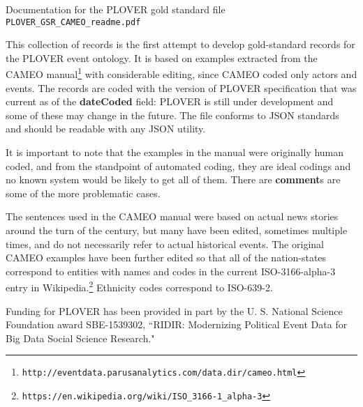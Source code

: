 \documentclass[11pt, oneside]{article}   	%
\newcommand{\field}[1]{\textsf{\textbf{#1}}}
\begin{document}
\begin{center}
\Large{Documentation for the PLOVER gold standard file \texttt{PLOVER\_GSR\_CAMEO\_readme.pdf}}
\end{center}
This collection of records  is the first attempt to develop gold-standard records for the PLOVER event ontology. It is based on examples extracted 
    from the CAMEO manual\footnote{\texttt{http://eventdata.parusanalytics.com/data.dir/cameo.html}} with considerable editing, since CAMEO 
    coded only actors and events. The records are coded with the version of PLOVER specification that was current as of the \field{dateCoded}
    field: PLOVER is still under development and some of these may change in the future. The file conforms to JSON standards
    and should be readable with any JSON utility.

    It is important to note that the examples in the manual were originally human coded, and from the standpoint of automated 
    coding, they are ideal codings and no known system would be likely to get all of them. There are \field{comment}s are some of
    the more problematic cases. 

    The sentences used in the CAMEO manual were based on actual news stories around the turn of the century, but many have 
    been edited, sometimes multiple times, and do not necessarily refer to actual historical events. The original CAMEO examples have been 
    further edited so that all of the nation-states correspond to entities with names and codes in the current ISO-3166-alpha-3 
    entry in Wikipedia.\footnote{\texttt{https://en.wikipedia.org/wiki/ISO\_3166-1\_alpha-3}} Ethnicity codes correspond to ISO-639-2.
    
    Funding for PLOVER has been provided in part by the U. S. National Science Foundation award SBE-1539302, ``RIDIR: Modernizing 
    Political Event Data for Big Data Social Science Research."
    
\end{document}
